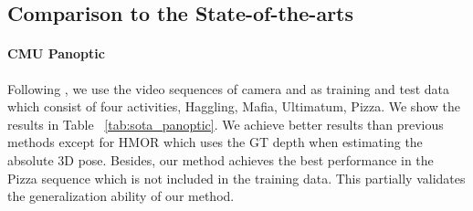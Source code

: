 \begin{table}
    \centering
    \caption{Comparison to the state-of-the-art methods on the CMU Panoptic dataset. The metric is MPJPE (mm). \cite{wang2020hmor} uses the GT depth when estimating absolute 3D poses so it is not fairly comparable to other methods. Our method does not use paired images and poses data for training but it still achieves smaller errors than other methods.}
    \label{tab:sota_panoptic}
\end{table}

\subsection{Comparison to the State-of-the-arts}
\label{subsec:comparision}

\paragraph{\bf CMU Panoptic}\cite{joo2015panoptic} Following \cite{zanfir2018monocular}, we use the video sequences of camera  and  as training and test data which consist of four activities, \ie Haggling, Mafia, Ultimatum, Pizza. We show the results in Table ~\ref{tab:sota_panoptic}. We achieve better results than previous methods except for HMOR \cite{wang2020hmor}  which uses the GT depth when estimating the absolute 3D pose. Besides, our method achieves the best performance in the Pizza sequence which is not included in the training data. This partially validates the generalization ability of our method.



